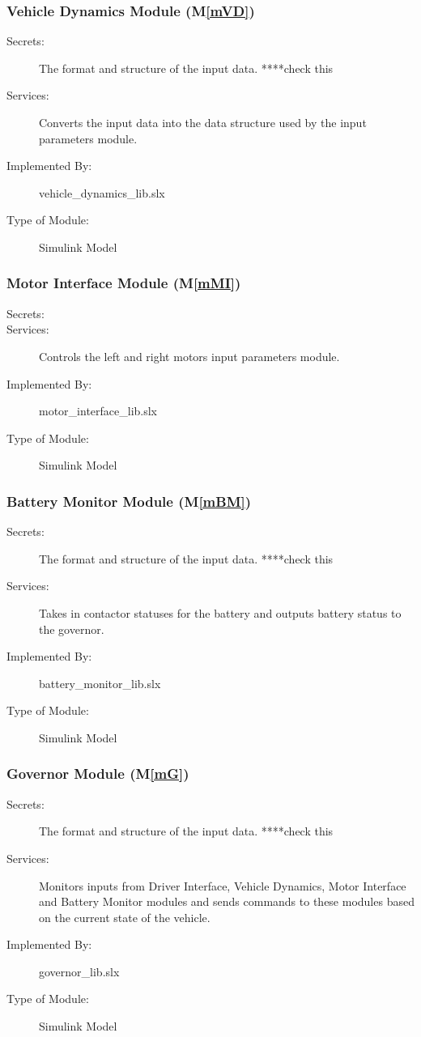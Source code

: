 \documentclass[12pt, titlepage]{article}
\newcommand{\mref}[1]{M\ref{#1}}
\begin{document}
\subsubsection{Vehicle Dynamics Module (\mref{mVD})}
\begin{description}
\item[Secrets:]The format and structure of the input data. ****check this
\item[Services:]Converts the input data into the data structure used by the
  input parameters module.
\item[Implemented By:] vehicle\_dynamics\_lib.slx
\item[Type of Module:] Simulink Model
\end{description}

\subsubsection{Motor Interface Module (\mref{mMI})}
\begin{description}
\item[Secrets:]
\item[Services:]Controls the left and right motors
  input parameters module.
\item[Implemented By:] motor\_interface\_lib.slx
\item[Type of Module:] Simulink Model
\end{description}

\subsubsection{Battery Monitor Module (\mref{mBM})}
\begin{description}
\item[Secrets:]The format and structure of the input data. ****check this
\item[Services:]Takes in contactor statuses for the battery and outputs battery status to the governor.
\item[Implemented By:] battery\_monitor\_lib.slx
\item[Type of Module:] Simulink Model
\end{description}

\subsubsection{Governor Module (\mref{mG})}
\begin{description}
\item[Secrets:]The format and structure of the input data. ****check this
\item[Services:]Monitors inputs from Driver Interface, Vehicle Dynamics, Motor Interface and Battery Monitor modules and sends commands to these modules based on the current state of the vehicle.
\item[Implemented By:] governor\_lib.slx
\item[Type of Module:] Simulink Model
\end{description}
\end{document}
